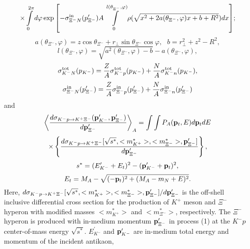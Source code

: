 \documentclass[12pt]{article}
\begin{document}
$$
\times
\int\limits_{0}^{2\pi}d{\varphi}\exp{\left[-\sigma_{{\Xi^-}N}^{\rm in}(p^{\prime}_{\Xi^-})A
\int\limits_{0}^{l(\theta_{{\Xi^-}},\varphi)}
\rho(\sqrt{x^2+2a(\theta_{{\Xi^-}},\varphi)x+b+R^2})dx\right]};
$$
\begin{equation}
a(\theta_{\Xi^-},\varphi)=z\cos{\theta_{\Xi^-}}+
r_{\bot}\sin{\theta_{\Xi^-}}\cos{\varphi},\,\,\,\,b=r_{\bot}^2+z^2-R^2,
\end{equation}
\begin{equation}
l(\theta_{\Xi^-},\varphi)=\sqrt{a^2(\theta_{\Xi^-},\varphi)-b}-
a(\theta_{\Xi^-},\varphi),
\end{equation}
\begin{equation}
\sigma_{{K^-}N}^{\rm tot}(p_{K^-})=
\frac{Z}{A}\sigma_{{K^-}p}^{\rm tot}(p_{K^-})+\frac{N}{A}\sigma_{{K^-}n}^{\rm tot}(p_{K^-}),
\end{equation}
\begin{equation}
\sigma_{{\Xi^-}N}^{\rm in}(p^{\prime}_{\Xi^-})=
\frac{Z}{A}\sigma_{{\Xi^-}p}^{\rm in}(p^{\prime}_{\Xi^-})+
\frac{N}{A}\sigma_{{\Xi^-}n}^{\rm in}(p^{\prime}_{\Xi^-})
\end{equation}
and
\begin{equation}
\left<\frac{d\sigma_{{K^-}p\to K^+{\Xi^-}}({\bf p}^{\prime}_{K^-},{\bf p}^{\prime}_{\Xi^-})}
{d{\bf p}^{\prime}_{\Xi^-}}\right>_A=
\int\int
P_A({\bf p}_t,E)d{\bf p}_tdE
\end{equation}
$$
\times
\left\{\frac{d\sigma_{{K^-}p\to K^+{\Xi^-}}[\sqrt{s^*},<m_{K^+}^*>,
<m_{\Xi^-}^*>,{\bf p}^{\prime}_{\Xi^-}]}
{d{\bf p}^{\prime}_{\Xi^-}}\right\},
$$
\begin{equation}
  s^*=(E^{\prime}_{K^-}+E_t)^2-({\bf p}^{\prime}_{K^-}+{\bf p}_t)^2,
\end{equation}
\begin{equation}
   E_t=M_A-\sqrt{(-{\bf p}_t)^2+(M_{A}-m_{N}+E)^{2}}.
\end{equation}
Here,
$d\sigma_{{K^-}p\to {K^+}{\Xi^-}}[\sqrt{s^*},<m_{K^+}^*>,<m_{\Xi^-}^*>,{\bf p}^{\prime}_{\Xi^-}]
/d{\bf p}^{\prime}_{\Xi^-}$
is the off-shell inclusive differential cross section for the production of $K^+$ meson and
$\Xi^-$ hyperon with modified masses $<m_{K^+}^*>$ and $<m_{\Xi^-}^*>$, respectively.
The $\Xi^-$ hyperon is produced with in-medium momentum
${\bf p}^{\prime}_{{\Xi^-}}$ in process (1) at the ${K^-}p$ center-of-mass energy $\sqrt{s^*}$.
$E^{\prime}_{K^-}$ and ${\bf p}^{\prime}_{K^-}$ are in-medium total energy and momentum of the incident antikaon,
\end{document}
